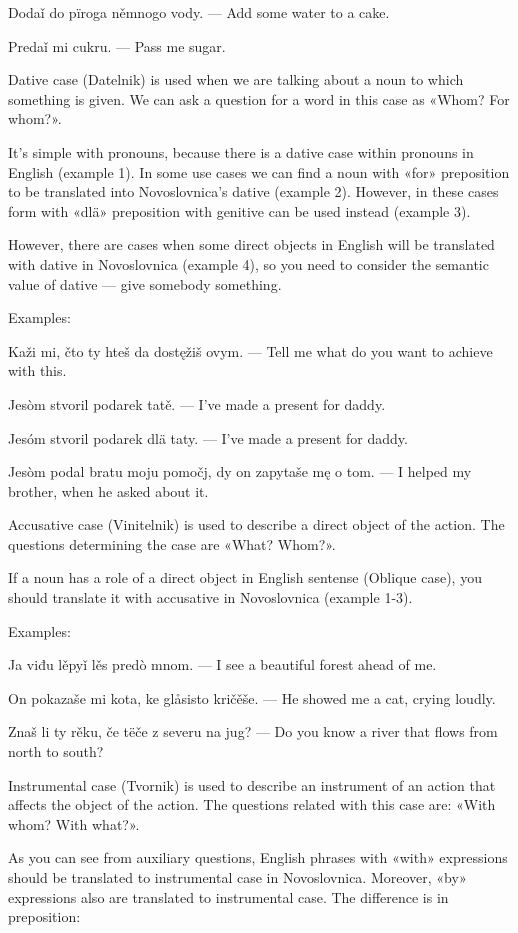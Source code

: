 Dodaǐ do pïroga němnogo vody. — Add some water to a cake.

Predaǐ mi cukru. — Pass me sugar.

Dative case (Datelnik) is used when we are talking about a noun to which something is given. We can ask a question for a word in this case as «Whom? For whom?».

It's simple with pronouns, because there is a dative case within pronouns in English (example 1). In some use cases we can find a noun with «for» preposition to be translated into Novoslovnica's dative (example 2). However, in these cases form with «dlä» preposition with genitive can be used instead (example 3).

However, there are cases when some direct objects in English will be translated with dative in Novoslovnica (example 4), so you need to consider the semantic value of dative — give somebody something.

Examples:

Kaži mi, čto ty hteš da dostęžiš ovym. — Tell me what do you want to achieve with this.

Jesòm stvoril podarek tatě. — I've made a present for daddy.

Jesóm stvoril podarek dlä taty. — I've made a present for daddy.

Jesòm podal bratu moju pomočj, dy on zapytaše mę o tom. — I helped my brother, when he asked about it.

Accusative case (Vinitelnik) is used to describe a direct object of the action. The questions determining the case are «What? Whom?».

If a noun has a role of a direct object in English sentense (Oblique case), you should translate it with accusative in Novoslovnica (example 1-3).

Examples:

Ja viđu lěpyǐ lěs predò mnom. — I see a beautiful forest ahead of me.

On pokazaše mi kota, ke glåsisto kričěše. — He showed me a cat, crying loudly.

Znaš li ty rěku, če tëče z severu na jug? — Do you know a river that flows from north to south?

Instrumental case (Tvornik) is used to describe an instrument of an action that affects the object of the action. The questions related with this case are: «With whom? With what?».

As you can see from auxiliary questions, English phrases with «with» expressions should be translated to instrumental case in Novoslovnica. Moreover, «by» expressions also are translated to instrumental case. The difference is in preposition:

